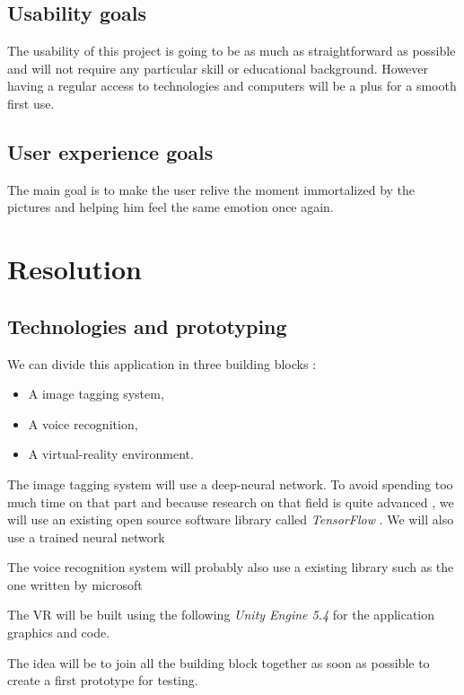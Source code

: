 \documentclass[11pt,a4paper]{article}
\begin{document}
\subsection{Usability goals}

The usability of this project is going to be as much as straightforward as possible and will not require any particular skill or educational background. However having a regular access to technologies and computers will be a plus for a smooth first use. 

\subsection{User experience goals}

The main goal is to make the user relive the moment immortalized by the pictures and helping him feel the same emotion once again.

\section{Resolution}

\subsection{Technologies and prototyping}

We can divide this application in three building blocks :
\begin{itemize}
	\item A image tagging system,
	\item A voice recognition,
	\item A virtual-reality environment.
\end{itemize}

The image tagging system will use a deep-neural network. To avoid spending too much time on that part and because research on that field is quite advanced , we will use an existing open source software library called \textit{TensorFlow} . We will also use a trained neural network 

The voice recognition system will probably also use a existing library such as the one written by microsoft

The VR will be built using the following \textit{Unity Engine 5.4}  for the application graphics and code. 

The idea will be to join all the building block together as soon as possible to create a first prototype for testing.
\end{document}

